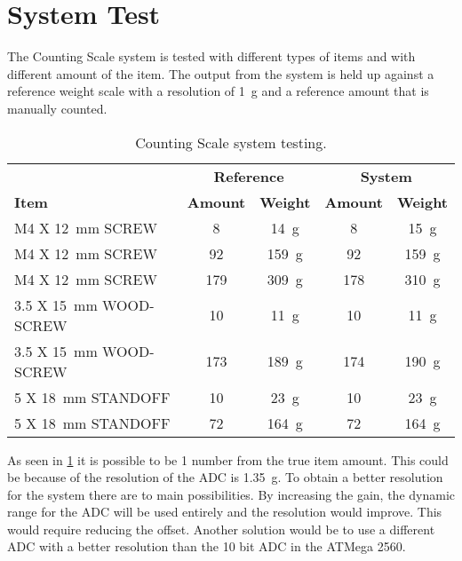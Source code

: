 \section{System Test}
The Counting Scale system is tested with different types of items and with different amount of the item.
The output from the system is held up against a reference weight scale with a resolution of \SI{1}{\gram} and a reference amount that is manually counted.

\begin{table}[H] 
	\centering
	\begin{threeparttable}
		\begin{tabular}{ l c c c c }
			
			& \multicolumn{2}{c}{\bfseries{Reference}} &
			  \multicolumn{2}{c}{\bfseries{System}}\\
			\bfseries{Item} &\bfseries{Amount}	&  \bfseries{Weight} & \bfseries{Amount} & \bfseries{Weight} \\
			\toprule
			M4 X \SI{12}{\milli\meter} SCREW & 8 & \SI{14}{\gram} & 8 & \SI{15}{\gram}\\
			M4 X \SI{12}{\milli\meter} SCREW & 92 & \SI{159}{\gram} & 92 & \SI{159}{\gram}\\
			M4 X \SI{12}{\milli\meter} SCREW & 179 & \SI{309}{\gram} & 178 & \SI{310}{\gram}\\
			3.5 X \SI{15}{\milli\meter} WOOD-SCREW & 10 & \SI{11}{\gram} & 10 & \SI{11}{\gram}\\
			3.5 X \SI{15}{\milli\meter} WOOD-SCREW & 173 & \SI{189}{\gram} & 174 & \SI{190}{\gram}\\
			5 X \SI{18}{\milli\meter} STANDOFF & 10 & \SI{23}{\gram} & 10 & \SI{23}{\gram}\\
			5 X \SI{18}{\milli\meter} STANDOFF & 72 & \SI{164}{\gram} & 72 & \SI{164}{\gram}\\
			\bottomrule
		\end{tabular}
	\end{threeparttable}
	\caption{Counting Scale system testing.}
	\label{tab:results}
\end{table}

As seen in \cref{tab:results} it is possible to be 1 number from the true item amount. 
This could be because of the resolution of the ADC is \SI{1.35}{\gram}.
To obtain a better resolution for the system there are to main possibilities.
By increasing the gain, the dynamic range for the ADC will be used entirely and the resolution would improve. 
This would require reducing the offset.
Another solution would be to use a different ADC with a better resolution than the 10 bit ADC in the ATMega 2560.

